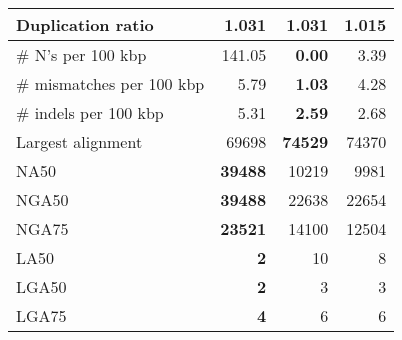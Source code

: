 \documentclass[12pt,a4paper]{article}
\begin{document}
\begin{table}[ht]
\begin{center}
\begin{tabular}{|l*{3}{|r}|}
Duplication ratio & 1.031 & 1.031 & {\bf 1.015} \\ \hline
\# N's per 100 kbp & 141.05 & {\bf 0.00} & 3.39 \\ \hline
\# mismatches per 100 kbp & 5.79 & {\bf 1.03} & 4.28 \\ \hline
\# indels per 100 kbp & 5.31 & {\bf 2.59} & 2.68 \\ \hline
Largest alignment & 69698 & {\bf 74529} & 74370 \\ \hline
NA50 & {\bf 39488} & 10219 & 9981 \\ \hline
NGA50 & {\bf 39488} & 22638 & 22654 \\ \hline
NGA75 & {\bf 23521} & 14100 & 12504 \\ \hline
LA50 & {\bf 2} & 10 & 8 \\ \hline
LGA50 & {\bf 2} & 3 & 3 \\ \hline
LGA75 & {\bf 4} & 6 & 6 \\ \hline
\end{tabular}
\end{center}
\end{table}
\end{document}

